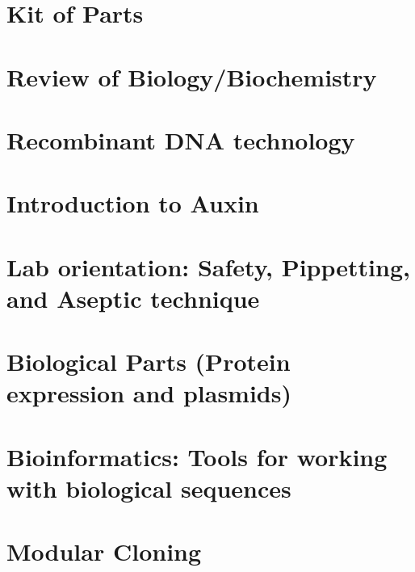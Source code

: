 \documentclass[
  letterpaper,
  DIV=11,
  numbers=noendperiod]{scrreprt}
\begin{document}

\chapter{Kit of Parts}\label{kit-of-parts}


\chapter{Review of
Biology/Biochemistry}\label{review-of-biologybiochemistry}


\chapter{Recombinant DNA technology}\label{recombinant-dna-technology}


\chapter{Introduction to Auxin}\label{introduction-to-auxin}


\chapter{Lab orientation: Safety, Pippetting, and Aseptic
technique}\label{lab-orientation-safety-pippetting-and-aseptic-technique}


\chapter{Biological Parts (Protein expression and
plasmids)}\label{biological-parts-protein-expression-and-plasmids}


\chapter{Bioinformatics: Tools for working with biological
sequences}\label{bioinformatics-tools-for-working-with-biological-sequences}


\chapter{Modular Cloning}\label{modular-cloning}
\end{document}
